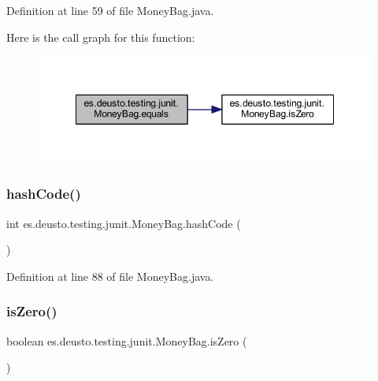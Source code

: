 Definition at line 59 of file Money\+Bag.\+java.

Here is the call graph for this function\+:
\nopagebreak
\begin{figure}[H]
\begin{center}
\leavevmode
\includegraphics[width=348pt]{classes_1_1deusto_1_1testing_1_1junit_1_1_money_bag_a80926d10c9619bd2ad84eabe52ca03bb_cgraph}
\end{center}
\end{figure}
\mbox{\label{classes_1_1deusto_1_1testing_1_1junit_1_1_money_bag_ae2c0d290a37a617f0a07134bf95162eb}} 
\subsubsection{\texorpdfstring{hashCode()}{hashCode()}}
{\footnotesize\ttfamily int es.\+deusto.\+testing.\+junit.\+Money\+Bag.\+hash\+Code (\begin{DoxyParamCaption}{ }\end{DoxyParamCaption})}



Definition at line 88 of file Money\+Bag.\+java.

\mbox{\label{classes_1_1deusto_1_1testing_1_1junit_1_1_money_bag_abebc5bc39c3343cb3c4e5fb291fd5893}} 
\subsubsection{\texorpdfstring{isZero()}{isZero()}}
{\footnotesize\ttfamily boolean es.\+deusto.\+testing.\+junit.\+Money\+Bag.\+is\+Zero (\begin{DoxyParamCaption}{ }\end{DoxyParamCaption})}

